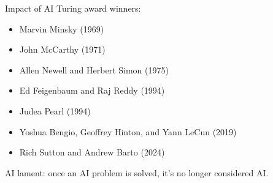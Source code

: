 \documentclass[
  10pt,
  ignorenonframetext,
  aspectratio=1610,
]{ltx-talk}
\providecommand{\tightlist}{%
  \setlength{\itemsep}{0pt}\setlength{\parskip}{0pt}}
\begin{document}
\begin{frame}{Impact of AI}
\protect{}\label{impact-of-ai}
Turing award winners:

\begin{itemize}
\tightlist
\item
  Marvin Minsky (1969)
\item
  John McCarthy (1971)
\item
  Allen Newell and Herbert Simon (1975)
\item
  Ed Feigenbaum and Raj Reddy (1994)
\item
  Judea Pearl (1994)
\item
  Yoshua Bengio, Geoffrey Hinton, and Yann LeCun (2019)
\item
  Rich Sutton and Andrew Barto (2024)
\end{itemize}

AI lament: once an AI problem is solved, it's no longer considered AI.
\end{frame}
\end{document}
